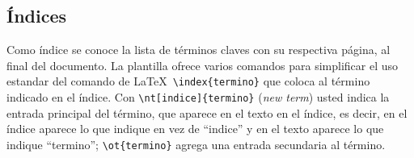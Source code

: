 \subsection{Índices}

Como índice se conoce la lista de términos claves con su respectiva página, al
final del documento.  La plantilla ofrece varios comandos para simplificar el
uso estandar del comando de \LaTeX\ \verb+\index{termino}+ que coloca al término
indicado en el índice.  Con \verb+\nt[indice]{termino}+ (\emph{new term}) usted
indica la entrada principal del término, que aparece en el texto en el índice,
es decir, en el índice aparece lo que indique en vez de ``indice'' y en el
texto aparece lo que indique ``termino''; \verb+\ot{termino}+ agrega una
entrada secundaria al término.
